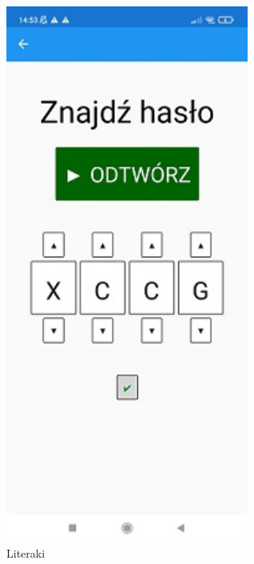 	\begin{figure}[!htb]
	\begin{center}
		\includegraphics[width=8cm]{rys/gra8.png}
		\caption{Literaki}
		\label{rys:rysunek001}
	\end{center}
\end{figure}
